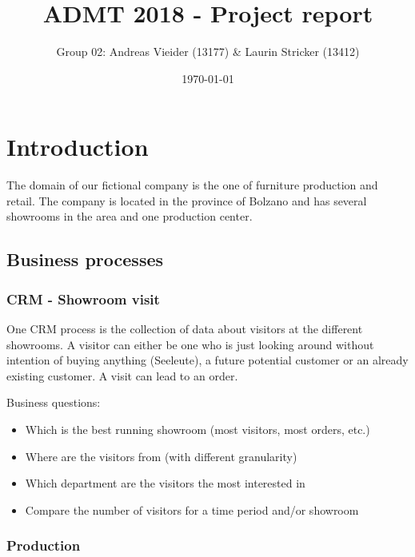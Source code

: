 \documentclass[letterpaper,12pt]{article}
\begin{document}
\title{ADMT 2018 - Project report}
\author{Group 02: Andreas Vieider (13177) \& Laurin Stricker (13412)}
\date{\today}
\maketitle

\tableofcontents
\listoffigures
\listoftables
\cleardoublepage



\section{Introduction}

The domain of our fictional company is the one of furniture production and retail. The company is located in the province of Bolzano and has several showrooms in the area and one production center.

\subsection{Business processes}

\subsubsection{CRM - Showroom visit}

One CRM process is the collection of data about visitors at the different showrooms. A visitor can either be one who is just looking around without intention of buying anything (Seeleute), a future potential customer or an already existing customer. A visit can lead to an order.

Business questions:
\begin{itemize}
        \item Which is the best running showroom (most visitors, most orders, etc.)
        \item Where are the visitors from (with different granularity)
        \item Which department are the visitors the most interested in
        \item Compare the number of visitors for a time period and/or showroom
\end{itemize}

\subsubsection{Production}
\end{document}
